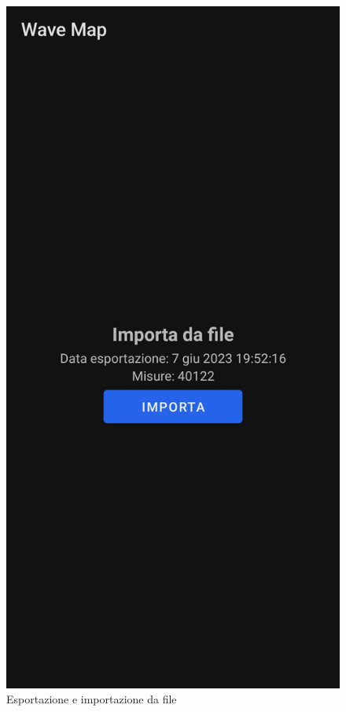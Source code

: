 \documentclass[11pt]{article}
\begin{document}
\begin{figure}[H]
\begin{minipage}[b]{0.25\textwidth}
    \end{minipage}
    \hspace*{1cm}
    \begin{minipage}[b]{0.25\textwidth}
      \includegraphics[width=\textwidth]{./img/overview/import.jpg}
    \end{minipage}
    \caption{Esportazione e importazione da file} \label{fig:overview_import_export}
\end{figure}
\end{document}
